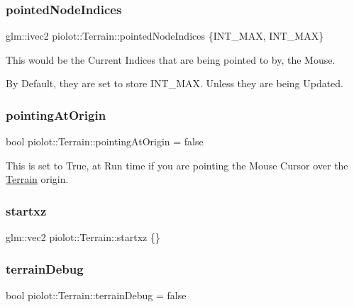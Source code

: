 \subsubsection{\texorpdfstring{pointed\+Node\+Indices}{pointedNodeIndices}}
{\footnotesize\ttfamily glm\+::ivec2 piolot\+::\+Terrain\+::pointed\+Node\+Indices \{I\+N\+T\+\_\+\+M\+AX, I\+N\+T\+\_\+\+M\+AX\}}



This would be the Current Indices that are being pointed to by, the Mouse. 

By Default, they are set to store I\+N\+T\+\_\+\+M\+AX. Unless they are being Updated. \mbox{\label{classpiolot_1_1_terrain_a408da4b61ad3fd021d84b71827c86bd6}} 
\subsubsection{\texorpdfstring{pointing\+At\+Origin}{pointingAtOrigin}}
{\footnotesize\ttfamily bool piolot\+::\+Terrain\+::pointing\+At\+Origin = false}



This is set to True, at Run time if you are pointing the Mouse Cursor over the \mbox{\hyperlink{classpiolot_1_1_terrain}{Terrain}} origin. 

\mbox{\label{classpiolot_1_1_terrain_aa658452ff45b3c472d7f8290ee689954}} 
\subsubsection{\texorpdfstring{startxz}{startxz}}
{\footnotesize\ttfamily glm\+::vec2 piolot\+::\+Terrain\+::startxz \{\}\hspace{0.3cm}{\ttfamily [private]}}

\mbox{\label{classpiolot_1_1_terrain_af15b6de452d8225d07d7d4ae48d4f154}} 
\subsubsection{\texorpdfstring{terrain\+Debug}{terrainDebug}}
{\footnotesize\ttfamily bool piolot\+::\+Terrain\+::terrain\+Debug = false}

